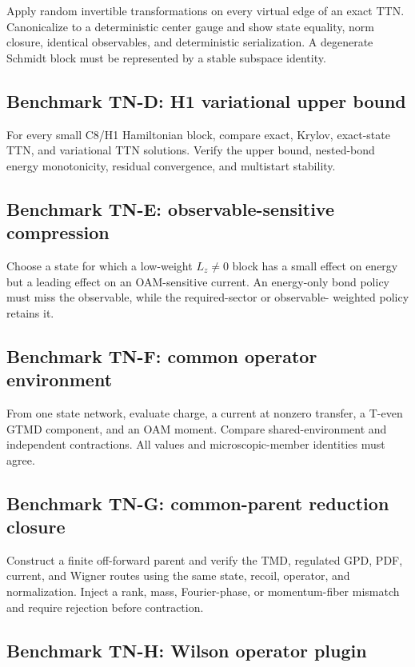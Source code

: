 \documentclass[11pt]{article}
\begin{document}
Apply random invertible transformations on every virtual edge of an exact TTN.
Canonicalize to a deterministic center gauge and show state equality, norm
closure, identical observables, and deterministic serialization.  A degenerate
Schmidt block must be represented by a stable subspace identity.

\subsection{Benchmark TN-D: H1 variational upper bound}

For every small C8/H1 Hamiltonian block, compare exact, Krylov, exact-state TTN,
and variational TTN solutions.  Verify the upper bound, nested-bond energy
monotonicity, residual convergence, and multistart stability.

\subsection{Benchmark TN-E: observable-sensitive compression}

Choose a state for which a low-weight \(L_z\neq0\) block has a small effect on
energy but a leading effect on an OAM-sensitive current.  An energy-only bond
policy must miss the observable, while the required-sector or observable-
weighted policy retains it.

\subsection{Benchmark TN-F: common operator environment}

From one state network, evaluate charge, a current at nonzero transfer, a T-even
GTMD component, and an OAM moment.  Compare shared-environment and independent
contractions.  All values and microscopic-member identities must agree.

\subsection{Benchmark TN-G: common-parent reduction closure}

Construct a finite off-forward parent and verify the TMD, regulated GPD, PDF,
current, and Wigner routes using the same state, recoil, operator, and
normalization.  Inject a rank, mass, Fourier-phase, or momentum-fiber mismatch
and require rejection before contraction.

\subsection{Benchmark TN-H: Wilson operator plugin}
\end{document}
